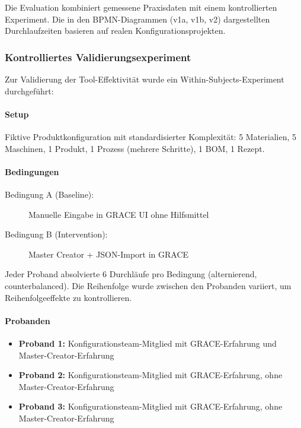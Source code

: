 Die Evaluation kombiniert gemessene Praxisdaten mit einem kontrollierten Experiment. Die in den BPMN-Diagrammen (v1a, v1b, v2) dargestellten Durchlaufzeiten basieren auf realen Konfigurationsprojekten.

\subsubsection{Kontrolliertes Validierungsexperiment}
\label{subsubsec:Experiment}

Zur Validierung der Tool-Effektivität wurde ein Within-Subjects-Experiment durchgeführt:

\paragraph{Setup}
Fiktive Produktkonfiguration mit standardisierter Komplexität: 5 Materialien, 5 Maschinen, 1 Produkt, 1 Prozess (mehrere Schritte), 1 BOM, 1 Rezept.

\paragraph{Bedingungen}
\begin{description}
    \item[Bedingung A (Baseline):] Manuelle Eingabe in GRACE UI ohne Hilfsmittel
    \item[Bedingung B (Intervention):] Master Creator + JSON-Import in GRACE
\end{description}

Jeder Proband absolvierte 6 Durchläufe pro Bedingung (alternierend, counterbalanced). Die Reihenfolge wurde zwischen den Probanden variiert, um Reihenfolgeeffekte zu kontrollieren.

\paragraph{Probanden}
\begin{itemize}
    \item \textbf{Proband 1:} Konfigurationsteam-Mitglied mit GRACE-Erfahrung und Master-Creator-Erfahrung
    \item \textbf{Proband 2:} Konfigurationsteam-Mitglied mit GRACE-Erfahrung, ohne Master-Creator-Erfahrung
    \item \textbf{Proband 3:} Konfigurationsteam-Mitglied mit GRACE-Erfahrung, ohne Master-Creator-Erfahrung
\end{itemize}


